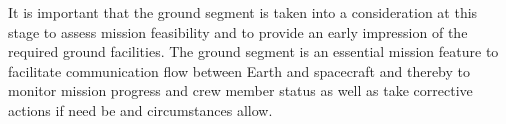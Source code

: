 It is important that the ground segment is taken into a consideration at this stage to assess mission feasibility and to provide an early impression of the required ground facilities. The ground segment is an essential mission feature to facilitate communication flow between Earth and spacecraft and thereby to monitor mission progress and crew member status as well as take corrective actions if need be and circumstances allow.






